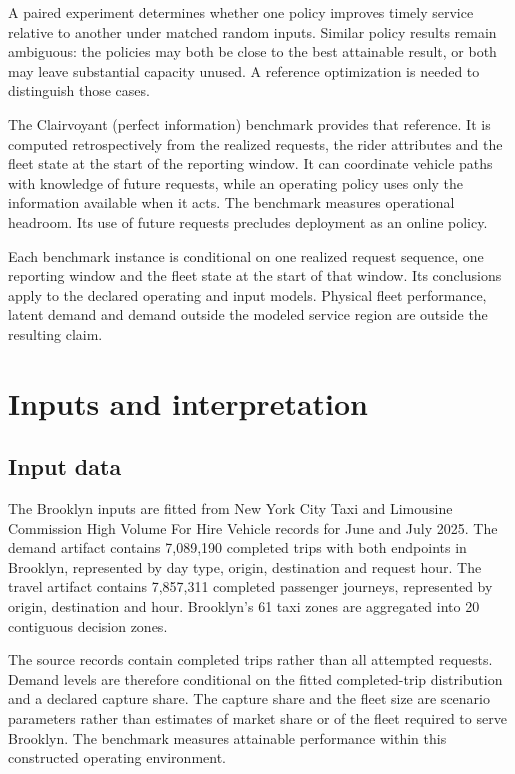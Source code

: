 A paired experiment determines whether one policy improves timely service relative to
another under matched random inputs. Similar policy results remain ambiguous: the policies may both
be close to the best attainable result, or both may leave substantial capacity unused. A reference
optimization is needed to distinguish those cases.

The Clairvoyant (perfect information) benchmark provides that reference. It is computed
retrospectively from the realized requests, the rider attributes and the fleet state at the start of
the reporting window. It can coordinate vehicle paths with knowledge of future requests, while an
operating policy uses only the information available when it acts. The benchmark measures operational
headroom. Its use of future requests precludes deployment as an online policy.

Each benchmark instance is conditional on one realized request sequence, one reporting window and the
fleet state at the start of that window. Its conclusions apply to the declared operating and input
models. Physical fleet performance, latent demand and demand outside the modeled service region are
outside the resulting claim.

\section{Inputs and interpretation}
\label{sec:study}

\subsection{Input data}

The Brooklyn inputs are fitted from New York City Taxi and Limousine Commission High Volume For Hire
Vehicle records for June and July 2025. The demand artifact contains 7,089,190 completed trips with both
endpoints in Brooklyn, represented by day type, origin, destination and request hour. The travel
artifact contains 7,857,311 completed passenger journeys, represented by origin, destination and hour.
Brooklyn's 61 taxi zones are aggregated into 20 contiguous decision zones.

The source records contain completed trips rather than all attempted requests. Demand levels are
therefore conditional on the fitted completed-trip distribution and a declared capture share. The
capture share and the fleet size are scenario parameters rather than estimates of market share or of
the fleet required to serve Brooklyn. The benchmark measures attainable performance within this
constructed operating environment.

